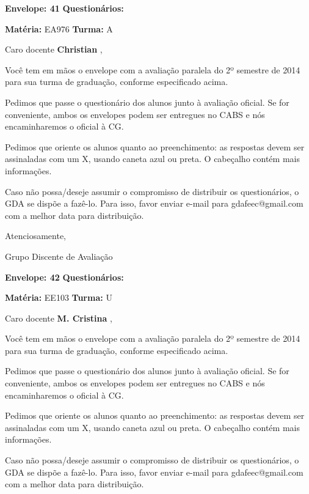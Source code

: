 \documentclass[a5paper]{letter}
\begin{document}
\vspace{0.5cm}

{\bf Envelope: 41 }		\hfill	{\bf Questionários:} \hspace{2cm}

\newpage
\thispagestyle{empty}

\hfill {\bf Matéria:} EA976 {\bf Turma:} A

Caro docente {\bf Christian }, 

	Você tem em mãos o envelope com a avaliação paralela do 2º semestre de 2014 para sua turma de graduação, conforme especificado acima.

	Pedimos que passe o questionário dos alunos junto à avaliação oficial. Se for conveniente, ambos os envelopes podem ser entregues no CABS e nós encaminharemos o oficial à CG.

Pedimos que oriente os alunos quanto ao preenchimento: as respostas devem ser assinaladas com um X, usando caneta azul ou preta. O cabeçalho contém mais informações.

	Caso não possa/deseje assumir o compromisso de distribuir os questionários, o GDA se dispõe a fazê-lo. Para isso, favor enviar e-mail para gdafeec@gmail.com com a melhor data para distribuição.


Atenciosamente, 

Grupo Discente de Avaliação

\vspace{0.5cm}

{\bf Envelope: 42 }		\hfill	{\bf Questionários:} \hspace{2cm}

\newpage
\thispagestyle{empty}

\hfill {\bf Matéria:} EE103 {\bf Turma:} U

Caro docente {\bf M. Cristina }, 

	Você tem em mãos o envelope com a avaliação paralela do 2º semestre de 2014 para sua turma de graduação, conforme especificado acima.

	Pedimos que passe o questionário dos alunos junto à avaliação oficial. Se for conveniente, ambos os envelopes podem ser entregues no CABS e nós encaminharemos o oficial à CG.

Pedimos que oriente os alunos quanto ao preenchimento: as respostas devem ser assinaladas com um X, usando caneta azul ou preta. O cabeçalho contém mais informações.

	Caso não possa/deseje assumir o compromisso de distribuir os questionários, o GDA se dispõe a fazê-lo. Para isso, favor enviar e-mail para gdafeec@gmail.com com a melhor data para distribuição.
\end{document}
